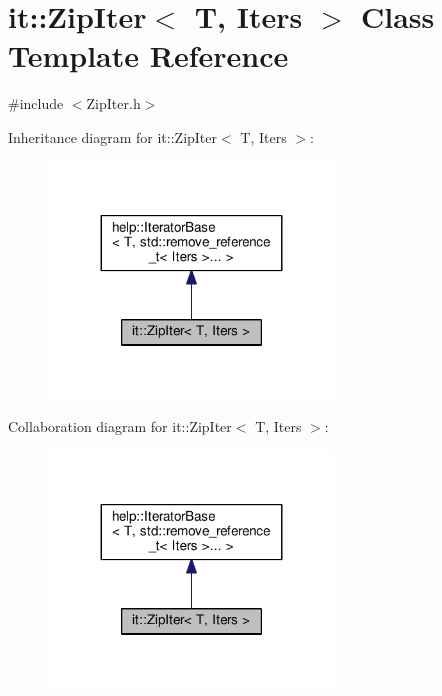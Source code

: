 \hypertarget{classit_1_1ZipIter}{}\section{it\+:\+:Zip\+Iter$<$ T, Iters $>$ Class Template Reference}
\label{classit_1_1ZipIter}


{\ttfamily \#include $<$Zip\+Iter.\+h$>$}



Inheritance diagram for it\+:\+:Zip\+Iter$<$ T, Iters $>$\+:\nopagebreak
\begin{figure}[H]
\begin{center}
\leavevmode
\includegraphics[width=215pt]{classit_1_1ZipIter__inherit__graph}
\end{center}
\end{figure}


Collaboration diagram for it\+:\+:Zip\+Iter$<$ T, Iters $>$\+:\nopagebreak
\begin{figure}[H]
\begin{center}
\leavevmode
\includegraphics[width=215pt]{classit_1_1ZipIter__coll__graph}
\end{center}
\end{figure}
